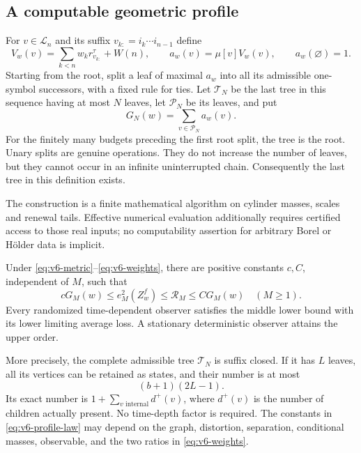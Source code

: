 \subsection{A computable geometric profile}
For $v\in\mathcal L_n$ and its suffix $v_{k:}=i_k\cdots i_{n-1}$ define
\begin{equation}
 V_w(v)=\sum_{k<n}w_kr_{v_{k:}}^\tau+W(n),\qquad
 a_w(v)=\mu[v]V_w(v),\qquad a_w(\varnothing)=1.            \label{eq:v6-energy}
\end{equation}
Starting from the root, split a leaf of maximal $a_w$ into all its
admissible one-symbol successors, with a fixed rule for ties. Let
$\mathcal T_N$ be the last tree in this sequence having at most $N$
leaves, let $\mathcal P_N$ be its leaves, and put
\begin{equation}
 G_N(w)=\sum_{v\in\mathcal P_N}a_w(v).                   \label{eq:v6-profile}
\end{equation}
For the finitely many budgets preceding the first root split, the tree
is the root. Unary splits are genuine operations. They do not increase
the number of leaves, but they cannot occur in an infinite uninterrupted
chain. Consequently the last tree in this definition exists.

The construction is a finite mathematical algorithm on cylinder masses,
scales and renewal tails. Effective numerical evaluation additionally
requires certified access to those real inputs; no computability
assertion for arbitrary Borel or H\"older data is implicit.

\begin{theorem}\label{thm:v6-profile}
Under \eqref{eq:v6-metric}--\eqref{eq:v6-weights}, there are positive
constants $c,C$, independent of $M$, such that
\begin{equation}
 cG_M(w)\le e_M^2(Z_w^f)\le\mathcal R_M\le CG_M(w)
                  \quad(M\ge1).                        \label{eq:v6-profile-law}
\end{equation}
Every randomized time-dependent observer satisfies the middle lower
bound with its lower limiting average loss. A stationary deterministic
observer attains the upper order.

More precisely, the complete admissible tree $\mathcal T_N$ is suffix
closed. If it has $L$ leaves, all its vertices can be retained as states,
and their number is at most
\begin{equation}
                 (b+1)(2L-1).                           \label{eq:v6-state-count}
\end{equation}
Its exact number is $1+\sum_{v\text{ internal}}d^+(v)$, where $d^+(v)$
is the number of children actually present. No time-depth factor is
required. The constants in \eqref{eq:v6-profile-law} may depend on the
graph, distortion, separation, conditional masses, observable, and the
two ratios in \eqref{eq:v6-weights}.
\end{theorem}

